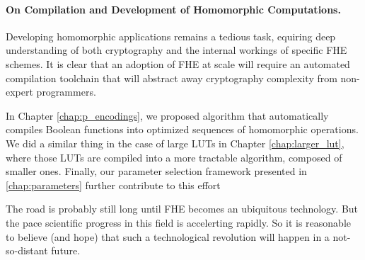 \paragraph{On Compilation and Development of Homomorphic Computations.}
%

Developing homomorphic applications remains a tedious task, equiring deep understanding of both cryptography and the internal workings of specific \gls{FHE} schemes. It is clear that an adoption of \gls{FHE} at scale will require an automated compilation toolchain that will abstract away cryptography complexity from non-expert programmers.

In Chapter \ref{chap:p_encodings}, we proposed algorithm that automatically compiles Boolean functions into optimized sequences of homomorphic operations. We did a similar thing in the case of large LUTs in Chapter \ref{chap:larger_lut}, where those LUTs are compiled into a more tractable algorithm, composed of smaller ones. Finally, our parameter selection framework presented in \ref{chap:parameters} further contribute to this effort


\bigskip

The road is probably still long until \gls{FHE} becomes an ubiquitous technology. But the pace scientific progress in this field is accelerting rapidly. So it is reasonable to believe (and hope) that such a technological revolution will happen in a not-so-distant future.





